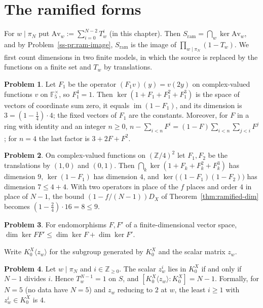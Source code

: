 \documentclass[reqno]{amsart}
\newcounter{chap}
\theoremstyle{definition}
\newtheorem{problem}{Problem}[section]
\theoremstyle{plain}
\theoremstyle{definition}
\newcommand{\Z}{\mathbb{Z}}
\newcommand{\F}{\mathbb{F}}
\newcommand{\Sram}{S_{\mathrm{ram}}}
\newcommand{\Av}{\mathrm{Av}}
\begin{document}
\section{The ramified forms}\label{sec:ramified}

For \(w \mid \pi_N\) put \(\Av_w := \sum_{i=0}^{N-2}T_w^i\) (in this chapter).  Then \(\Sram = \bigcap_w \ker\Av_w\), and by Problem~\ref{ss-pr:ram-image}, \(\Sram\) is the image of \(\prod_{w \mid \pi_N}(1 - T_w)\).  We first count dimensions in two finite models, in which the source is replaced by the functions on a finite set and \(T_w\) by translations.

\begin{problem}\label{pr:fp-instance}
Let \(F_1\) be the operator \((F_1v)(y) = v(2y)\) on complex-valued functions \(v\) on \(\F_5^\times\), so \(F_1^4 = 1\).  Then \(\ker(1 + F_1 + F_1^2 + F_1^3)\) is the space of vectors of coordinate sum zero, it equals \(\operatorname{im}(1 - F_1)\), and its dimension is \(3 = (1 - \tfrac14)\cdot 4\); the fixed vectors of \(F_1\) are the constants.  Moreover, for \(F\) in a ring with identity and an integer \(n \ge 0\), \(n - \sum_{i<n}F^i = (1 - F)\sum_{i<n}\sum_{j<i}F^j\); for \(n = 4\) the last factor is \(3 + 2F + F^2\).
\end{problem}

\begin{problem}\label{pr:z4-instance}
On complex-valued functions on \((\Z/4)^2\) let \(F_1, F_2\) be the translations by \((1, 0)\) and \((0, 1)\).  Then \(\bigcap_k\ker(1 + F_k + F_k^2 + F_k^3)\) has dimension \(9\), \(\ker(1 - F_1)\) has dimension \(4\), and \(\ker\bigl((1 - F_1)(1 - F_2)\bigr)\) has dimension \(7 \le 4 + 4\).  With two operators in place of the \(f\) places and order \(4\) in place of \(N - 1\), the bound \((1 - f/(N - 1))D_X\) of Theorem~\ref{thm:ramified-dim} becomes \((1 - \tfrac24)\cdot16 = 8 \le 9\).
\end{problem}

\begin{problem}\label{pr:kernel-sum}
For endomorphisms \(F, F'\) of a finite-dimensional vector space, \(\dim\ker FF' \le \dim\ker F + \dim\ker F'\).
\end{problem}

Write \(K^X_0\langle z_w\rangle\) for the subgroup generated by \(K^X_0\) and the scalar matrix \(z_w\).

\begin{problem}\label{pr:order}
Let \(w \mid \pi_N\) and \(i \in \Z_{\ge 0}\).  The scalar \(z_w^i\) lies in \(K^X_0\) if and only if \(N - 1\) divides \(i\).  Hence \(T_w^{N-1} = 1\) on \(S\), and \([K^X_0\langle z_w\rangle : K^X_0] = N - 1\).  Formally, for \(N = 5\) (no data have \(N = 5\)) and \(z_w\) reducing to \(2\) at \(w\), the least \(i \ge 1\) with \(z_w^i \in K^X_0\) is \(4\).
\end{problem}
\end{document}
